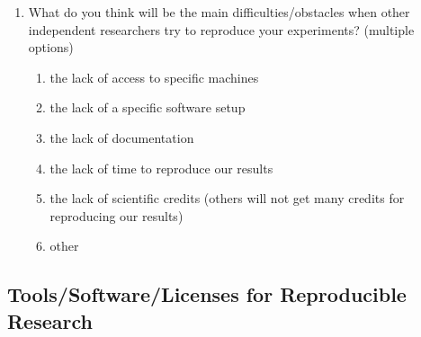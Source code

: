 \documentclass{article}\usepackage[]{graphicx}\usepackage[]{color}
\begin{document}
\begin{enumerate}
\item What do you think will be the main difficulties/obstacles when
other independent researchers try to reproduce your experiments?
(multiple options)
\begin{enumerate}
\item the lack of access to specific machines
\item the lack of a specific software setup
\item the lack of documentation
\item the lack of time to reproduce our results
\item the lack of scientific credits (others will not get many
credits for reproducing our results)
\item other
\end{enumerate}
\end{enumerate}

\subsection{Tools/Software/Licenses for Reproducible Research}
\label{sec-4}
\end{document}
